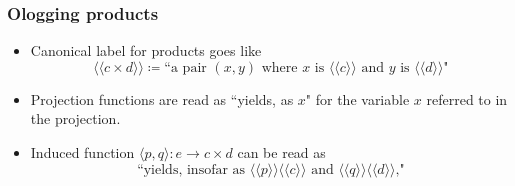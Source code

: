 \documentclass{article}
\begin{document}
\subsubsection{Ologging products}
\begin{itemize}
\item Canonical label for products goes like
\begin{equation*}
\langle \langle c \times d \rangle \rangle \coloneqq \text{``a pair } (x,y) \text{ where } x \text{ is } \langle \langle c  \rangle \rangle \text{ and } y \text{ is } \langle \langle d \rangle \rangle \text{"}
\end{equation*}
\item Projection functions are read as ``yields, as $x$" for the variable $x$ referred to in the projection.
\item Induced function $\langle p, q \rangle : e \rightarrow c \times d$ can be read as 
\begin{equation*}
\text{``yields, insofar as } \langle \langle p  \rangle \rangle \langle \langle c  \rangle \rangle \text{ and } \langle \langle q  \rangle \rangle \langle \langle d  \rangle \rangle \text{,"}
\end{equation*}
\end{itemize}
\end{document}
